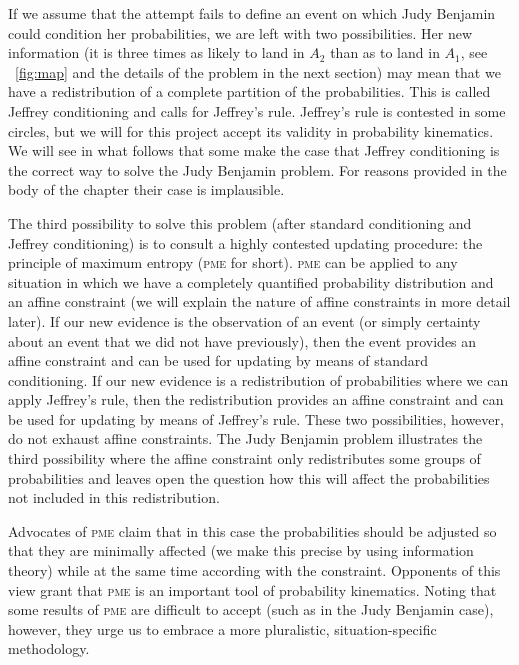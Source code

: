 \documentclass[phd,12pt,oneside]{ubcthesis}
\begin{document}
If we assume that the attempt fails to define an event on which Judy
Benjamin could condition her probabilities, we are left with two
possibilities. Her new information (it is three times as likely to
land in $A_{2}$ than as to land in $A_{1}$, see {\igure}~\ref{fig:map}
and the details of the problem in the next section) may mean that we
have a redistribution of a complete partition of the probabilities.
This is called Jeffrey conditioning and calls for Jeffrey's rule.
Jeffrey's rule is contested in some circles, but we will for this
project accept its validity in probability kinematics. We will see in
what follows that some make the case that Jeffrey conditioning is the
correct way to solve the Judy Benjamin problem. For reasons provided
in the body of the chapter their case is implausible.

The third possibility to solve this problem (after standard
conditioning and Jeffrey conditioning) is to consult a highly
contested updating procedure: the principle of maximum entropy
(\textsc{pme} for short). \textsc{pme} can be applied to any
situation in which we have a completely quantified probability
distribution and an affine constraint (we will explain the nature of
affine constraints in more detail later). If our new evidence is the
observation of an event (or simply certainty about an event that we
did not have previously), then the event provides an affine constraint
and can be used for updating by means of standard conditioning. If our
new evidence is a redistribution of probabilities where we can apply
Jeffrey's rule, then the redistribution provides an affine constraint
and can be used for updating by means of Jeffrey's rule. These two
possibilities, however, do not exhaust affine constraints. The Judy
Benjamin problem illustrates the third possibility where the affine
constraint only redistributes some groups of probabilities and leaves
open the question how this will affect the probabilities not included
in this redistribution.

Advocates of \textsc{pme} claim that in this case the probabilities
should be adjusted so that they are minimally affected (we make this
precise by using information theory) while at the same time according
with the constraint. Opponents of this view grant that \textsc{pme}
is an important tool of probability kinematics. Noting that some
results of \textsc{pme} are difficult to accept (such as in the
Judy Benjamin case), however, they urge us to embrace a more
pluralistic, situation-specific methodology.
\end{document}
